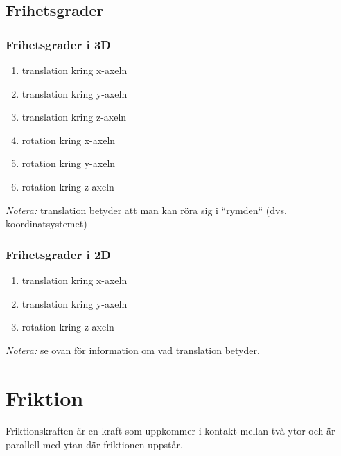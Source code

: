 \documentclass{article}
\newenvironment{ankiflashcard}[1][ ]{}{}
\begin{document}
\begin{paracol}{2}
\begin{ankiflashcard}
    
\subsection{Frihetsgrader}
\subsubsection{Frihetsgrader i 3D}

\begin{enumerate}[label*=\protect\fbox{\arabic{enumi}}]
\item translation kring x-axeln
\item translation kring y-axeln
\item translation kring z-axeln
\item rotation kring x-axeln
\item rotation kring y-axeln
\item rotation kring z-axeln
\end{enumerate}
\textit{Notera:} translation betyder att man kan röra sig i ``rymden`` (dvs. koordinatsystemet)
\end{ankiflashcard}

\begin{ankiflashcard}
    
\subsubsection{Frihetsgrader i 2D}
\begin{enumerate}[label*=\protect\fbox{\arabic{enumi}}]
\item translation kring x-axeln
\item translation kring y-axeln
\item rotation kring z-axeln
\end{enumerate}
\textit{Notera:} se ovan för information om vad translation betyder.
\end{ankiflashcard}
    
\section{Friktion}
Friktionskraften är en kraft som uppkommer i kontakt mellan två ytor och är parallell med ytan där friktionen uppstår.

\begin{ankiflashcard}

\end{ankiflashcard}
\end{paracol}
\end{document}

